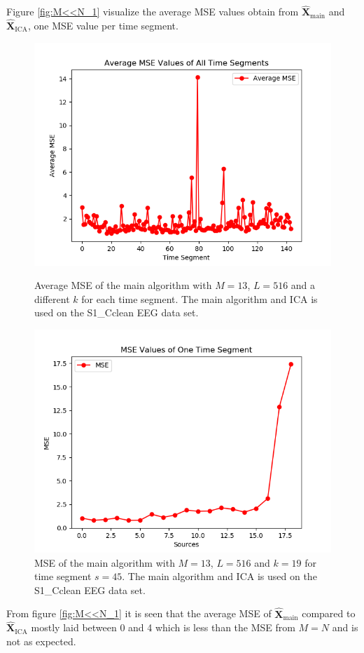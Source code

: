 Figure \ref{fig:M<<N_1} visualize the average MSE values obtain from $\hat{\mathbf{X}}_{\text{main}}$ and $\hat{\mathbf{X}}_{\text{ICA}}$, one MSE value per time segment.
\begin{figure}[H]
    \begin{minipage}[t]{.45\textwidth}
		\centering
		\includegraphics[scale=0.5]{figures/ch_7/AveMSE_2M_N.png}
	\caption{Average MSE of the main algorithm with $M=13$, $L = 516$ and a different $k$ for each time segment. The main algorithm and ICA is used on the S1\_Cclean EEG data set.}
	\label{fig:M<<N_1}
    \end{minipage} 
    \hfill
    \begin{minipage}[t]{.45\textwidth}
        \centering
		\includegraphics[scale=0.5]{figures/ch_7/MSE_2M_N.png}
	\caption{MSE of the main algorithm with $M=13$, $L = 516$ and $k=19$ for time segment $s=45$. The main algorithm and ICA is used on the S1\_Cclean EEG data set.}
	\label{fig:M<<N_2}
    \end{minipage}
\end{figure}
\noindent
From figure \ref{fig:M<<N_1} it is seen that the average MSE of $\hat{\mathbf{X}}_{\text{main}}$ compared to $\hat{\mathbf{X}}_{\text{ICA}}$ mostly laid between 0 and 4 which is less than the MSE from $M=N$ and is not as expected. 

